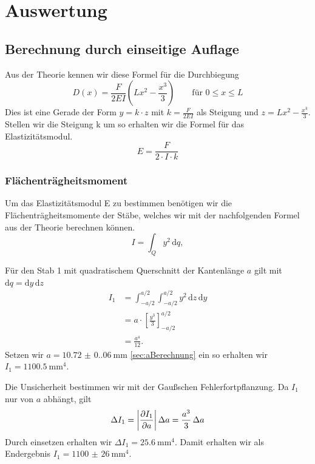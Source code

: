 \section{Auswertung}
\label{sec:Auswertung}

\subsection{Berechnung durch einseitige Auflage}
Aus der Theorie kennen wir diese Formel für die Durchbiegung 
\begin{equation}
  D(x) = \frac{F}{2EI} \left( L x^2 - \frac{x^3}{3} \right) \qquad \text{für } 0 \le x \le L
  \label{eqn:Durchbiegung1}
\end{equation}
Dies ist eine Gerade der Form $y = k \cdot z$ mit $k = \frac{F}{2EI}$ als Steigung und $z = L x^2 - \frac{x^3}{3}$.
Stellen wir die Steigung k um so erhalten wir die Formel für das Elastizitätsmodul.
\begin{equation}
  E = \frac{F}{2 \cdot I \cdot k}
  \label{eqn:E}
\end{equation}

\subsubsection{Flächenträgheitsmoment}
Um das Elastizitätsmodul E zu bestimmen benötigen wir die Flächenträgheitsmomente der Stäbe, welches wir mit der nachfolgenden Formel aus der Theorie berechnen können.
\begin{equation}
   I = \int_Q y^2 \, \mathrm{d}q ,
  \label{eqn:Flaechentraegheit}
\end{equation}

Für den Stab 1 mit quadratischem Querschnitt der Kantenlänge $a$ gilt mit $\mathrm{d}q = \mathrm{d}y \, \mathrm{d}z$
\begin{align}
  I_1 &= \int_{-a/2}^{a/2} \int_{-a/2}^{a/2} y^2 \, \mathrm{d}z \, \mathrm{d}y \nonumber \\
      &= a \cdot \left[ \frac{y^3}{3} \right]_{-a/2}^{a/2} \nonumber \\
      &= \frac{a^4}{12}.
\end{align}
Setzen wir  $a = \qty{10.72(0.06)}{\milli\meter}$ \ref{sec:aBerechnung} ein so erhalten wir $ I_1 = \qty{1100,5}{\milli\meter\tothe{4}} $.

Die Unsicherheit bestimmen wir mit der Gaußschen Fehlerfortpflanzung.
Da $I_1$ nur von $a$ abhängt, gilt
\begin{align}
  \Delta I_1 &= \left|\frac{\partial I_1}{\partial a}\right| \Delta a
              = \frac{a^3}{3}\,\Delta a \notag \\
\end{align}
Durch einsetzen erhalten wir $\Delta I_1 = \qty{25,6}{\milli\meter\tothe{4}}$.
Damit erhalten wir als Endergebnis $I_1 = \qty{1100(26)}{\milli\meter\tothe{4}}$. \label{sec:I1}


